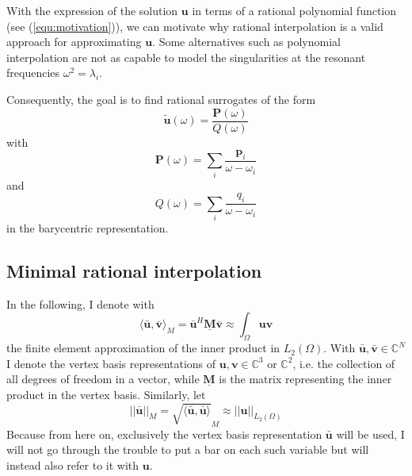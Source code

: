 \documentclass[11pt, a4paper]{article}
\begin{document}
With the expression of the solution $\mathbf{u}$ in terms of a rational polynomial
function (see (\ref{equ:motivation})), we can motivate why rational interpolation
is a valid approach for approximating $\mathbf{u}$. Some alternatives such as polynomial
interpolation are not as capable to model the singularities at the resonant
frequencies $\omega^2 = \lambda_i$.

Consequently, the goal is to find rational surrogates of the form
\begin{equation}
    \mathbf{\tilde{u}}(\omega) = \frac{\mathbf{P}(\omega)}{Q(\omega)}
\end{equation}
with
\begin{equation}
    \mathbf{P}(\omega) = \sum_i \frac{\mathbf{p}_i}{\omega - \omega_i}
\end{equation}
and
\begin{equation}
    Q(\omega) = \sum_i \frac{q_i}{\omega - \omega_i} \label{equ:surrogate-denominator}
\end{equation}
in the barycentric representation.

\subsection{Minimal rational interpolation}
\label{subsec:MRI}

In the following, I denote with
\begin{equation}
    \langle \mathbf{\bar{u}}, \mathbf{\bar{v}} \rangle_M = \mathbf{\bar{u}}^H \mathbf{\underline{M}} \mathbf{\bar{v}} \approx \int_{\Omega} \mathbf{u} \mathbf{v} \label{equ:matrix-inner-product}
\end{equation}
the finite element approximation of the inner product in $L_2(\Omega)$.
With $\mathbf{\bar{u}}, \mathbf{\bar{v}} \in \mathbb{C}^N$ I denote the vertex basis
representations of $\mathbf{u}, \mathbf{v} \in \mathbb{C}^3$ or $\mathbb{C}^2$,
i.e. the collection of all degrees of freedom in a vector, while $\mathbf{\underline{M}}$
is the matrix representing the inner product in the vertex basis. Similarly, let
\begin{equation}
    ||\mathbf{\bar{u}}||_M = \sqrt{\langle \mathbf{\bar{u}}, \mathbf{\bar{u}} \rangle}_M \approx ||\mathbf{u}||_{L_2(\Omega)} \label{equ:matrix-norm}
\end{equation}
Because from here on, exclusively the vertex basis representation $\mathbf{\bar{u}}$
will be used, I will not go through the trouble to put a bar on each such variable
but will instead also refer to it with $\mathbf{u}$.
\end{document}
